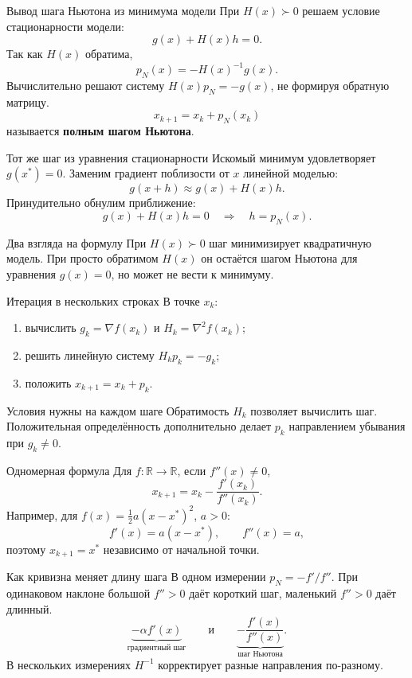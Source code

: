 \documentclass[aspectratio=169,10pt]{beamer}
\newcommand{\R}{\mathbb{R}}
\begin{document}
\begin{frame}{Вывод шага Ньютона из минимума модели}
\small
При $H(x)\succ0$ решаем условие стационарности модели:
\[
g(x)+H(x)h=0.
\]
Так как $H(x)$ обратима,
\[
\boxed{p_N(x)=-H(x)^{-1}g(x).}
\]
Вычислительно решают систему $H(x)p_N=-g(x)$, не формируя обратную матрицу.
\[
\boxed{x_{k+1}=x_k+p_N(x_k)}
\]
называется \textbf{полным шагом Ньютона}.
\end{frame}

\begin{frame}{Тот же шаг из уравнения стационарности}
\small
Искомый минимум удовлетворяет $g(x^*)=0$. Заменим градиент поблизости от $x$ линейной моделью:
\[
g(x+h)\approx g(x)+H(x)h.
\]
Принудительно обнулим приближение:
\[
g(x)+H(x)h=0
\quad\Longrightarrow\quad h=p_N(x).
\]
\begin{block}{Два взгляда на формулу}
При $H(x)\succ0$ шаг минимизирует квадратичную модель. При просто обратимом $H(x)$ он остаётся шагом Ньютона для уравнения $g(x)=0$, но может не вести к минимуму.
\end{block}
\end{frame}

\begin{frame}{Итерация в нескольких строках}
\small
В точке $x_k$:
\begin{enumerate}
\item вычислить $g_k=\nabla f(x_k)$ и $H_k=\nabla^2 f(x_k)$;
\item решить линейную систему $H_kp_k=-g_k$;
\item положить $x_{k+1}=x_k+p_k$.
\end{enumerate}
\begin{alertblock}{Условия нужны на каждом шаге}
Обратимость $H_k$ позволяет вычислить шаг. Положительная определённость дополнительно делает $p_k$ направлением убывания при $g_k\ne0$.
\end{alertblock}
\end{frame}

\begin{frame}{Одномерная формула}
\small
Для $f:\R\to\R$, если $f''(x)\ne0$,
\[
\boxed{x_{k+1}=x_k-\frac{f'(x_k)}{f''(x_k)}.}
\]
Например, для $f(x)=\frac12 a(x-x^*)^2$, $a>0$:
\[
f'(x)=a(x-x^*),\qquad f''(x)=a,
\]
поэтому $x_{k+1}=x^*$ независимо от начальной точки.
\end{frame}

\begin{frame}{Как кривизна меняет длину шага}
\small
В одном измерении $p_N=-f'/f''$. При одинаковом наклоне большой $f''>0$ даёт короткий шаг, маленький $f''>0$ даёт длинный.
\[
\underbrace{-\alpha f'(x)}_{\text{градиентный шаг}}
\qquad\text{и}\qquad
\underbrace{-\frac{f'(x)}{f''(x)}}_{\text{шаг Ньютона}}.
\]
В нескольких измерениях $H^{-1}$ корректирует разные направления по-разному.
\end{frame}
\end{document}
